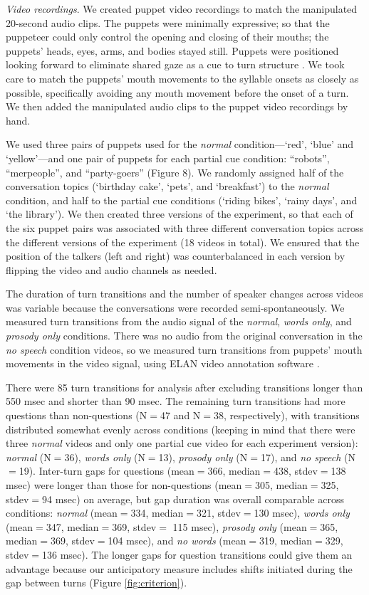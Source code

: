 \documentclass[authoryear, 12pt]{elsarticle}
\begin{document}
\textit{Video recordings}. We created puppet video recordings to match the manipulated 20-second audio clips. The puppets were minimally expressive; so that the puppeteer could only control the opening and closing of their mouths; the puppets' heads, eyes, arms, and bodies stayed still. Puppets were positioned looking forward to eliminate shared gaze as a cue to turn structure \citep{thorgrimsson2015}. We took care to match the puppets' mouth movements to the syllable onsets as closely as possible, specifically avoiding any mouth movement before the onset of a turn. We then added the manipulated audio clips to the puppet video recordings by hand.

We used three pairs of puppets used for the \textit{normal} condition---`red', `blue' and `yellow'---and one pair of puppets for each partial cue condition: ``robots'', ``merpeople'', and ``party-goers'' (Figure 8). We randomly assigned half of the conversation topics (`birthday cake', `pets', and `breakfast') to the \textit{normal} condition, and half to the partial cue conditions (`riding bikes', `rainy days', and `the library'). We then created three versions of the experiment, so that each of the six puppet pairs was associated with three different conversation topics across the different versions of the experiment (18 videos in total). We ensured that the position of the talkers (left and right) was counterbalanced in each version by flipping the video and audio channels as needed.

The duration of turn transitions and the number of speaker changes across videos was variable because the conversations were recorded semi-spontaneously. We measured turn transitions from the audio signal of the \textit{normal}, \textit{words only}, and \textit{prosody only} conditions. There was no audio from the original conversation in the \textit{no speech} condition videos, so we measured turn transitions from puppets' mouth movements in the video signal, using ELAN video annotation software \citep{ELAN}.

There were 85 turn transitions for analysis after excluding transitions longer than 550 msec and shorter than 90 msec. The remaining turn transitions had more questions than non-questions (N$=$47 and N$=$38, respectively), with transitions distributed somewhat evenly across conditions (keeping in mind that there were three \textit{normal} videos and only one partial cue video for each experiment version): \textit{normal} (N$=$36), \textit{words only} (N$=$13), \textit{prosody only} (N$=$17), and \textit{no speech} (N$=$19). Inter-turn gaps for questions (mean$=$366, median$=$438, stdev$=$138 msec) were longer than those for non-questions (mean$=$305, median$=$325, stdev$=$94 msec) on average, but gap duration was overall comparable across conditions: \textit{normal} (mean$=$334, median$=$321, stdev$=$130 msec), \textit{words only} (mean$=$347, median$=$369, stdev$=$ 115 msec), \textit{prosody only} (mean$=$365, median$=$369, stdev$=$104 msec), and \textit{no words} (mean$=$319, median$=$329, stdev$=$136 msec). The longer gaps for question transitions could give them an advantage because our anticipatory measure includes shifts initiated during the gap between turns (Figure \ref{fig:criterion}).
\end{document}
